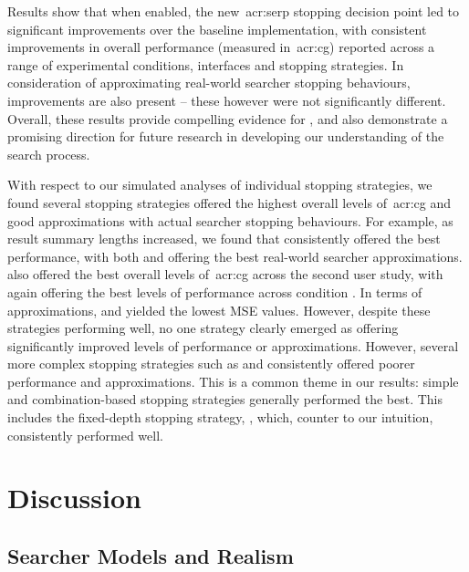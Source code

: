 Results show that when enabled, the new~\gls{acr:serp} stopping decision point led to significant improvements over the baseline implementation, with consistent improvements in overall performance (measured in~\gls{acr:cg}) reported across a range of experimental conditions, interfaces and stopping strategies. In consideration of approximating real-world searcher stopping behaviours, improvements are also present -- these however were not significantly different. Overall, these results provide compelling evidence for , and also demonstrate a promising direction for future research in developing our understanding of the search process.

With respect to our simulated analyses of individual stopping strategies, we found several stopping strategies offered the highest overall levels of~\gls{acr:cg} and good approximations with actual searcher stopping behaviours. For example, as result summary lengths increased, we found that  consistently offered the best performance, with both  and  offering the best real-world searcher approximations.  also offered the best overall levels of~\gls{acr:cg} across the second user study, with  again offering the best levels of performance across condition . In terms of approximations,  and  yielded the lowest MSE values. However, despite these strategies performing well, no one strategy clearly emerged as offering significantly improved levels of performance or approximations. However, several more complex stopping strategies such as  and  consistently offered poorer performance and approximations. This is a common theme in our results: simple and combination-based stopping strategies generally performed the best. This includes the fixed-depth stopping strategy, , which, counter to our intuition, consistently performed well.

\section{Discussion}\label{sec:conclusions:discussion}

\subsection{Searcher Models and Realism}

